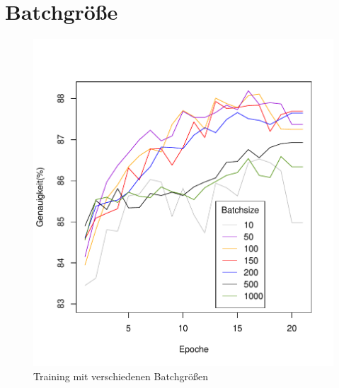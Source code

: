 \section{Batchgröße}
\begin{figure}[H]
	\centering
	\includegraphics[scale=0.9]{./bilder/batchsize_measurement}
	\caption{Training mit verschiedenen Batchgrößen}
	\label{fig:batchsize}
\end{figure}
